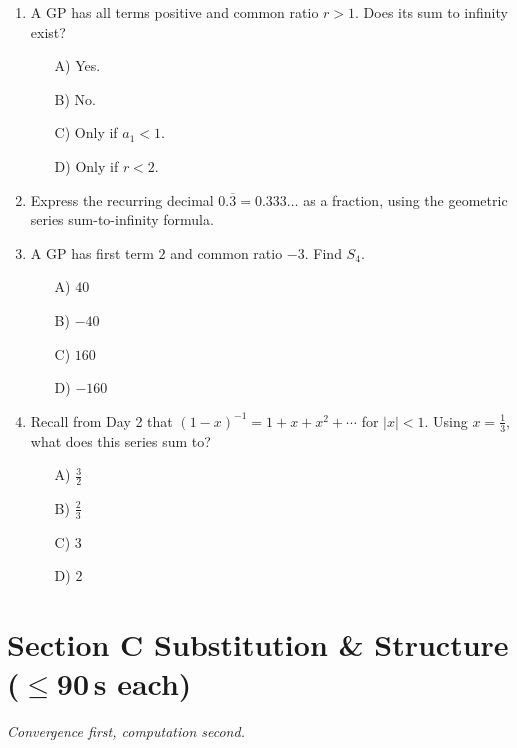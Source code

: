 \documentclass[11pt,a4paper]{article}
\begin{document}
\begin{enumerate}
\item A GP has all terms positive and common ratio $r>1$. Does its sum to infinity exist?
\begin{itemize}
\item[A)] Yes.
\item[B)] No.
\item[C)] Only if $a_1<1$.
\item[D)] Only if $r<2$.
\end{itemize}

\item Express the recurring decimal $0.\overline3=0.333\ldots$ as a fraction, using the geometric series sum-to-infinity formula.

\item A GP has first term $2$ and common ratio $-3$. Find $S_4$.
\begin{itemize}
\item[A)] $40$
\item[B)] $-40$
\item[C)] $160$
\item[D)] $-160$
\end{itemize}

\item Recall from Day 2 that $(1-x)^{-1}=1+x+x^2+\cdots$ for $|x|<1$. Using $x=\tfrac13$, what does this series sum to?
\begin{itemize}
\item[A)] $\tfrac32$
\item[B)] $\tfrac23$
\item[C)] $3$
\item[D)] $2$
\end{itemize}

\end{enumerate}

\section*{Section C \quad Substitution \& Structure \hfill{\normalfont\small($\leq$90\,s each)}}

\noindent\textit{Convergence first, computation second.}
\end{document}
